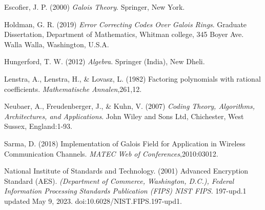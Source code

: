 \begin{thebibliography}{9}

Escofier, J. P. (2000) \emph{Galois Theory}. Springer, New York.

Holdman, G. R. (2019) \emph{Error Correcting Codes  Over Galois Rings}. Graduate Dissertation, Department of Mathematics, Whitman college, 345 Boyer Ave.
Walla Walla, Washington, U.S.A.

Hungerford, T. W. (2012) \emph{Algebra}. Springer (India), New Dheli.

Lenstra, A., Lenstra, H.,  \& Lovasz, L. (1982)  Factoring polynomials with rational coefficients. \emph{Mathematische Annalen},261,12.

Neubaer, A.,  Freudenberger, J.,  \& Kuhn, V. (2007) \emph{Coding Theory, Algorithms, Architectures, and Applications}. John Wiley and Sons Ltd, Chichester, West Sussex, England:1-93.

Sarma, D. (2018) Implementation of Galois Field for Application in Wireless Communication Channels. \emph{MATEC Web of Conferences},2010:03012.

National Institute of Standards and Technology. (2001) Advanced Encryption
Standard (AES). \emph{(Department of Commerce, Washington, D.C.), Federal Information Processing Standards Publication (FIPS) NIST FIPS}. 197-upd.1 updated May 9, 2023. doi:10.6028/NIST.FIPS.197-upd1.
\end{thebibliography}
\clearpage
